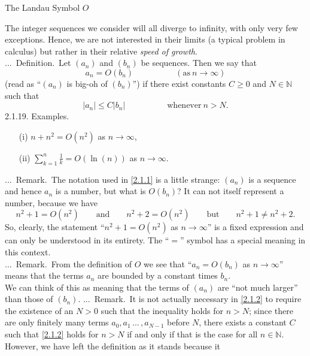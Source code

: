 \documentclass[smaller,hyperref={CJKbookmarks=true}]{beamer}
\newcommand{\N}{\mathbb{N}} \newcommand{\Z}{\mathbb{Z}} \newcommand{\Q}{\mathbb{Q}}
\newcounter{zhuo}[subsection]
\renewcommand{\thezhuo}{\thesection.\thesubsection.\arabic{zhuo}}
\newenvironment{DEFINITION}{\stepcounter{zhuo}\alert{\thezhuo.~Definition.\,}}{}
\newenvironment{REMARK}{\stepcounter{zhuo}\alert{\thezhuo.~Remark.\,}}{}
\begin{document}
\begin{frame}{The Landau Symbol $O$}
\begin{spacing}{1.05}
The integer sequences we consider will all diverge to infinity, with only
very few exceptions. Hence, we are not interested in their limits (a typical
problem in calculus) but rather in their relative \emph{speed of growth}.\\[4pt]
\begin{DEFINITION}
Let $(a_n)$ and $(b_n)$ be sequences. Then we say that
\setcounter{equation}{0}
\begin{equation}\label{2.1.1}
a_n=O(b_n)\qquad\qquad\quad(\text{as}~n\to\infty)
\end{equation}
(read as ``$(a_n)$ is big-oh of $(b_n)$'') if there exist constants $C\geq0$ and $N\in\N$ such that
\begin{equation}\label{2.1.2}
|a_n|\leq C|b_n|\qquad\qquad\quad\text{whenever}~n>N.
\end{equation}
\end{DEFINITION}
\!\!\!\!\alert{2.1.19. Examples.}\\
\begin{itemize}
  \item[(i)] $n+n^2=O(n^2)$ as $n\to\infty$,
  \item[(ii)] $\displaystyle\sum_{k=1}^{n}\frac{1}{k}=O(\ln(n))$ as $n\to\infty$.
\end{itemize}
\newpage
\begin{REMARK}
The notation used in \eqref{2.1.1} is a little strange: $(a_n)$ is a sequence and hence $a_n$ is a number, but what is $O(b_n)$? It can not itself represent a number, because we have
\[n^2+1=O(n^2)\qquad\text{and}\qquad n^2+2=O(n^2)\qquad\text{but}\qquad
n^2+1\neq n^2+2.\]
So, clearly, the statement ``$n^2+1=O(n^2)$ as $n\to\infty$'' is a fixed expression and can only be understood in its entirety. The ``$=$'' symbol has a special meaning in this context.\\[5pt]
\end{REMARK}
\begin{REMARK}
From the definition of $O$ we see that ``$a_n=O(b_n)$ as $n\to\infty$'' means that the terms $a_n$ are bounded by a constant times $b_n$.\\[4pt]
We can think of this as meaning that the terms of $(a_n)$ are ``not much larger'' than those of $(b_n)$.
\end{REMARK}
\newpage
\begin{REMARK}
It is not actually necessary in \eqref{2.1.2} to require the existence of an $N>0$ such that the inequality holds for $n>N$; since there are only finitely many terms $a_0,a_1\,...\,,a_{N-1}$ before $N$, there exists a constant $C$ such that \eqref{2.1.2}  holds for $n>N$ if and only if that is the case for all $n\in\N$. However, we have left the definition as it stands because it

\end{REMARK}
\end{spacing}
\end{frame}
\end{document}
